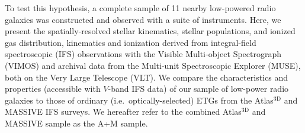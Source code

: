 \documentclass[a4paper,fleqn,usenatbib]{mnras}
\begin{document}



	To test this hypothesis, a complete sample of 11 nearby low-powered radio galaxies was constructed and observed with a suite of instruments. Here, we present the spatially-resolved stellar kinematics, stellar populations, and ionized gas distribution, kinematics and ionization derived from integral-field spectroscopic (IFS) observations with the Visible Multi-object Spectrograph (VIMOS) and archival data from the Multi-unit Spectroscopic Explorer (MUSE), both on the Very Large Telescope (VLT). We compare the characteristics and properties (accessible with $V$-band IFS data) of our sample of low-power radio galaxies to those of ordinary (i.e.\ optically-selected) ETGs from the Atlas$^\text{3D}$ and MASSIVE IFS surveys. We hereafter refer to the combined Atlas$^\text{3D}$ and MASSIVE sample as the A+M sample.
\end{document}
